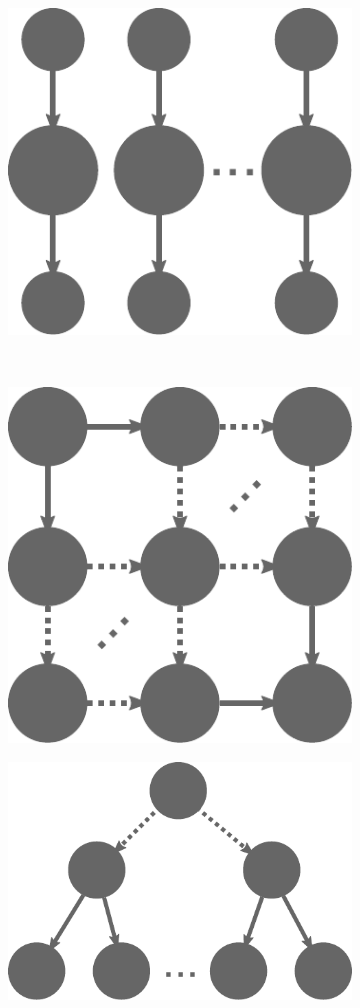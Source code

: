 \begin{figure}[h]
\begin{subfigure}{.2\textwidth}
		\includegraphics[width=.8\linewidth]{imgs/estee/shapes/triplets}
		\caption{}
		\label{fig:tg-triplets}
	\end{subfigure}
	\\
	\begin{subfigure}{.2\textwidth}
		\centering
		\includegraphics[width=.8\linewidth]{imgs/estee/shapes/grid}
		\caption{}
		\label{fig:tg-grid}
	\end{subfigure}
	\begin{subfigure}{.2\textwidth}
		\centering
		\includegraphics[width=.8\linewidth]{imgs/estee/shapes/splitters}

\end{subfigure}
\end{figure}
